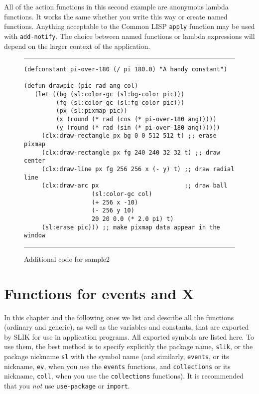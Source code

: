 \documentclass[twoside,openright,11pt]{report}
\newcommand{\tp}[1]{\texttt{#1}}
\begin{document}
All of the action functions in this second example are anonymous
lambda functions.  It works the same whether you write this way or
create named functions.  Anything acceptable to the Common LISP
\tp{apply} function may be used with \tp{add-notify}.  The choice
between named functions or lambda expressions will depend on the
larger context of the application.

\begin{figure}[htb]

\rule{\textwidth}{1mm}

\begin{verbatim}
(defconstant pi-over-180 (/ pi 180.0) "A handy constant")

(defun drawpic (pic rad ang col)
   (let ((bg (sl:color-gc (sl:bg-color pic)))
         (fg (sl:color-gc (sl:fg-color pic)))
         (px (sl:pixmap pic))
         (x (round (* rad (cos (* pi-over-180 ang)))))
         (y (round (* rad (sin (* pi-over-180 ang))))))
     (clx:draw-rectangle px bg 0 0 512 512 t) ;; erase pixmap
     (clx:draw-rectangle px fg 240 240 32 32 t) ;; draw center
     (clx:draw-line px fg 256 256 x (- y) t) ;; draw radial line
     (clx:draw-arc px                        ;; draw ball
                   (sl:color-gc col)
                   (+ 256 x -10)
                   (- 256 y 10)
                   20 20 0.0 (* 2.0 pi) t)
     (sl:erase pic))) ;; make pixmap data appear in the window
\end{verbatim}

\rule{\textwidth}{1mm}

\caption{Additional code for sample2} \label{fig:sample2a}
\end{figure}

\chapter{Functions for events and X}

In this chapter and the following ones we list and describe all the
functions (ordinary and generic), as well as the variables and
constants, that are exported by SLIK for use in application programs.
All exported symbols are listed here.  To use them, the best method is
to specify explicitly the package name, \tp{slik}, or the package
nickname \tp{sl} with the symbol name (and similarly, \tp{events}, or
its nickname, \tp{ev}, when you use the \tp{events} functions, and
\tp{collections} or its nickname, \tp{coll}, when you use the
\tp{collections} functions).  It is recommended that you \emph{not}
use \tp{use-package} or \tp{import}.
\end{document}
